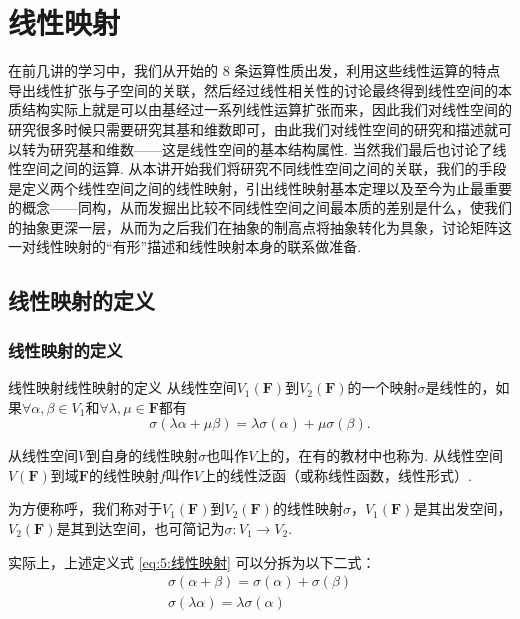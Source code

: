 \chapter{线性映射}

在前几讲的学习中，我们从开始的 8 条运算性质出发，利用这些线性运算的特点导出线性扩张与子空间的关联，然后经过线性相关性的讨论最终得到线性空间的本质结构实际上就是可以由基经过一系列线性运算扩张而来，因此我们对线性空间的研究很多时候只需要研究其基和维数即可，由此我们对线性空间的研究和描述就可以转为研究基和维数——这是线性空间的基本结构属性. 当然我们最后也讨论了线性空间之间的运算. 从本讲开始我们将研究不同线性空间之间的关联，我们的手段是定义两个线性空间之间的线性映射，引出线性映射基本定理以及至今为止最重要的概念——同构，从而发掘出比较不同线性空间之间最本质的差别是什么，使我们的抽象更深一层，从而为之后我们在抽象的制高点将抽象转化为具象，讨论矩阵这一对线性映射的``有形''描述和线性映射本身的联系做准备.

\section{线性映射的定义}

\subsection{线性映射的定义}

\begin{definition}{线性映射}{线性映射的定义} 
    从线性空间$V_1(\mathbf{F})$到$V_2(\mathbf{F})$的一个映射$\sigma$是线性的，如果$\forall \alpha,\beta \in V_1$和$\forall \lambda,\mu \in \mathbf{F}$都有
    \begin{equation}\label{eq:5:线性映射}
        \sigma(\lambda\alpha+\mu\beta)=\lambda\sigma(\alpha)+\mu\sigma(\beta).
    \end{equation}

    从线性空间$V$到自身的线性映射$\sigma$也叫作$V$上的，在有的教材中也称为. 从线性空间$V(\mathbf{F})$到域$\mathbf{F}$的线性映射$f$叫作$V$上的线性泛函（或称线性函数，线性形式）.

    为方便称呼，我们称对于$V_1(\mathbf{F})$到$V_2(\mathbf{F})$的线性映射$\sigma$，$V_1(\mathbf{F})$是其出发空间，$V_2(\mathbf{F})$是其到达空间，也可简记为$\sigma: V_1\to V_2$.
\end{definition}
实际上，上述定义式 \ref*{eq:5:线性映射} 可以分拆为以下二式：
\begin{gather}
    \tag{加性} \sigma(\alpha+\beta)=\sigma(\alpha)+\sigma(\beta) \\
    \tag{齐次性} \sigma(\lambda\alpha)=\lambda\sigma(\alpha)
\end{gather}

